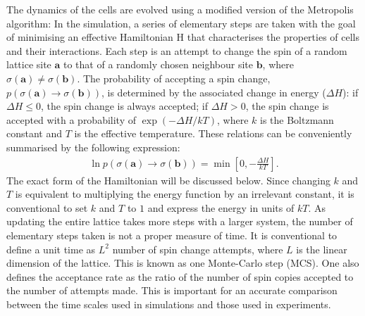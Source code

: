 \documentclass[a4paper,12pt]{article}
\newcommand{\inc}{\Delta}
\begin{document}
The dynamics of the cells are evolved using a modified version of the Metropolis algorithm: In the simulation, a series of elementary steps are taken with the goal of minimising an effective Hamiltonian H that characterises the properties of cells and their interactions. Each step is an attempt to change the spin of a random lattice site $\bm{a}$ to that of a randomly chosen neighbour site $\bm{b}$, where $\sigma(\bm{a}) \neq \sigma(\bm{b})$. The probability of accepting a spin change, $p\left(\sigma(\bm{a}) \rightarrow \sigma(\bm{b})\right)$, is determined by the associated change in energy ($\inc H$): if $\inc H \leq 0$, the spin change is always accepted; if $\inc H > 0$, the spin change is accepted with a probability of $\exp⁡(-\inc H / kT)$, where $k$ is the Boltzmann constant and $T$ is the effective temperature. These relations can be conveniently summarised by the following expression:
\begin{eqnarray}
\ln p\left(\sigma(\bm{a}) \rightarrow \sigma(\bm{b})\right) = \min\left[0,-\frac{\inc H}{kT}\right].
\end{eqnarray}
The exact form of the Hamiltonian will be discussed below. Since changing $k$ and $T$ is equivalent to multiplying the energy function by an irrelevant constant, it is conventional to set $k$ and $T$ to $1$ and express the energy in units of $kT$. As updating the entire lattice takes more steps with a larger system, the number of elementary steps taken is not a proper measure of time. It is conventional to define a unit time as $L^2$ number of spin change attempts, where $L$ is the linear dimension of the lattice. This is known as one Monte-Carlo step (MCS). One also defines the acceptance rate as the ratio of the number of spin copies accepted to the number of attempts made. This is important for an accurate comparison between the time scales used in simulations and those used in experiments\cite{sanz2010}.
\end{document}
